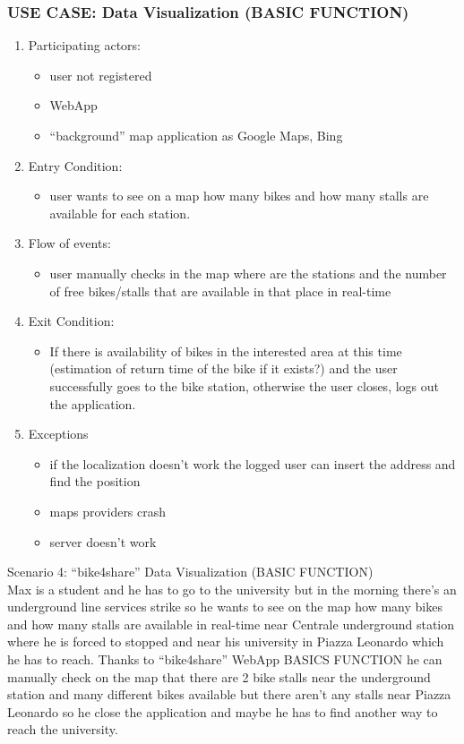 \documentclass{article}
\begin{document}
\subsubsection{\textbf{USE CASE}: Data Visualization (BASIC FUNCTION)}
\begin{enumerate}
\item Participating actors: 
\begin{itemize}
    \item user not registered
    \item WebApp
    \item “background” map application as Google Maps, Bing
\end{itemize}
\item Entry Condition: 
\begin{itemize}
    \item user wants to see on a map how many bikes and how many stalls are available for each station.
\end{itemize}
\item Flow of events: 
\begin{itemize}
    \item user manually checks in the map where are the stations and the number of free bikes/stalls that are available in that place in real-time
\end{itemize}
\item Exit Condition: 
\begin{itemize}
    \item If there is availability of bikes in the interested area at this time (estimation of return time of the bike if it exists?) and the user successfully goes to the bike station, otherwise the user closes, logs out  the application.
\end{itemize}
\item Exceptions
\begin{itemize}
    \item if the localization doesn’t work the logged user can insert the address and find the position
    \item maps providers crash
    \item server doesn’t work
\end{itemize}
\end{enumerate}

 Scenario 4: “bike4share” Data Visualization (BASIC FUNCTION) \\
Max is a student and he has to go to the university but in the morning there’s an underground line services strike so he wants to see on the map how many bikes and how many stalls are available in real-time near Centrale underground station where he is forced to stopped and near his university in Piazza Leonardo which he has to reach. 
Thanks to “bike4share” WebApp BASICS FUNCTION he can manually check on the map that there are 2 bike stalls near the underground station and many different bikes available but there aren’t any stalls near Piazza Leonardo so he close the application and maybe he has to find another way to reach the university.
\end{document}
